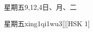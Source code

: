 \begin{entry}{星期五}{9,12,4}{⽇、⽉、⼆}
  \begin{phonetics}{星期五}{xing1qi1wu3}[][HSK 1]
  \end{phonetics}
\end{entry}
